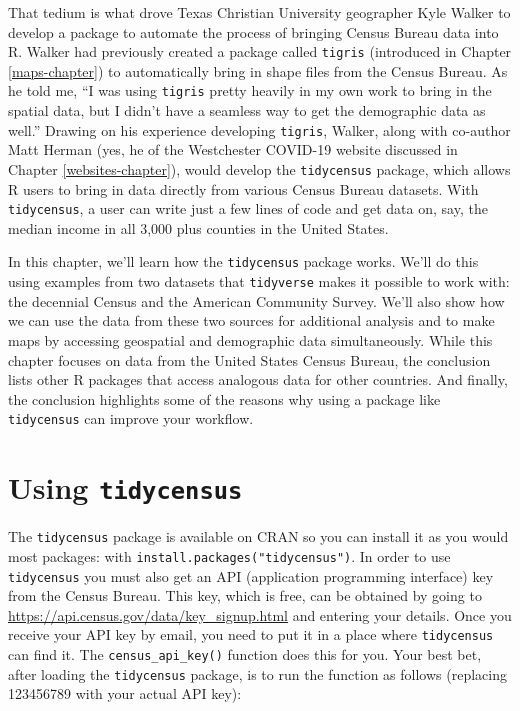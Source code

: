 \documentclass[
]{book}
\begin{document}
That tedium is what drove Texas Christian University geographer Kyle Walker to develop a package to automate the process of bringing Census Bureau data into R. Walker had previously created a package called \texttt{tigris} (introduced in Chapter \ref{maps-chapter}) to automatically bring in shape files from the Census Bureau. As he told me, ``I was using \texttt{tigris} pretty heavily in my own work to bring in the spatial data, but I didn't have a seamless way to get the demographic data as well.'' Drawing on his experience developing \texttt{tigris}, Walker, along with co-author Matt Herman (yes, he of the Westchester COVID-19 website discussed in Chapter \ref{websites-chapter}), would develop the \texttt{tidycensus} package, which allows R users to bring in data directly from various Census Bureau datasets. With \texttt{tidycensus}, a user can write just a few lines of code and get data on, say, the median income in all 3,000 plus counties in the United States.

In this chapter, we'll learn how the \texttt{tidycensus} package works. We'll do this using examples from two datasets that \texttt{tidyverse} makes it possible to work with: the decennial Census and the American Community Survey. We'll also show how we can use the data from these two sources for additional analysis and to make maps by accessing geospatial and demographic data simultaneously. While this chapter focuses on data from the United States Census Bureau, the conclusion lists other R packages that access analogous data for other countries. And finally, the conclusion highlights some of the reasons why using a package like \texttt{tidycensus} can improve your workflow.

\hypertarget{using-tidycensus}{%
\section*{\texorpdfstring{Using \texttt{tidycensus}}{Using tidycensus}}\label{using-tidycensus}}

The \texttt{tidycensus} package is available on CRAN so you can install it as you would most packages: with \texttt{install.packages("tidycensus")}. In order to use \texttt{tidycensus} you must also get an API (application programming interface) key from the Census Bureau. This key, which is free, can be obtained by going to \url{https://api.census.gov/data/key_signup.html} and entering your details. Once you receive your API key by email, you need to put it in a place where \texttt{tidycensus} can find it. The \texttt{census\_api\_key()} function does this for you. Your best bet, after loading the \texttt{tidycensus} package, is to run the function as follows (replacing 123456789 with your actual API key):
\end{document}
